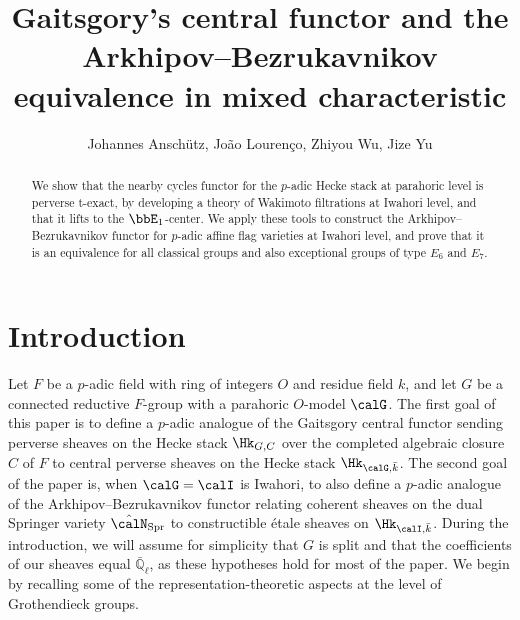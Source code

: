 \documentclass[10pt, reqno]{amsart}
\theoremstyle{plain}
\theoremstyle{definition}
\numberwithin{equation}{section}
\begin{document}
	
	\title[Gaitsgory and Arkhipov--Bezrukavnikov in mixed characteristic]{Gaitsgory's central functor and the Arkhipov--Bezrukavnikov equivalence in mixed characteristic}
	
	\author[J. Ansch\"utz, J. Louren\c{c}o, Z. Wu, J. Yu]{Johannes Ansch\"utz, Jo\~ao Louren\c{c}o, Zhiyou Wu, Jize Yu}
	
	
	\address{Département de Mathématiques, Université Paris-Saclay, Bâtiment 307, 91405 Orsay Cedex, France}
	
	
	
	\address{Mathematisches Institut, Universität Münster, Einsteinstrasse 62, Münster, Germany}
	
	\address{Morningside Center of Mathematics, Chinese Academy of Sciences, No. 55, Zhongguancun East Road, Haidian District, Beijing, China}
	
	\address{Department of Mathematics, Rice University, Houston, TX 77005, U.S.A.}
	
	\begin{abstract}
		We show that the nearby cycles functor for the $p$-adic Hecke stack at parahoric level is perverse t-exact, by developing a theory of Wakimoto filtrations at Iwahori level, and that it lifts to the $\bbE_1$-center. We apply these tools to construct the Arkhipov--Bezrukavnikov functor for $p$-adic affine flag varieties at Iwahori level, and prove that it is an equivalence for all classical groups and also exceptional groups of type $E_6$ and $E_7$. 
	\end{abstract}
	
	\maketitle
	\tableofcontents
	
	
	\section{Introduction} 
	\label{sec:introduction}
	
	Let $F$ be a $p$-adic field with ring of integers $O$ and residue field $k$, and let $G$ be a connected reductive $F$-group with a parahoric $O$-model $\calG$. The first goal of this paper is to define a $p$-adic analogue of the Gaitsgory central functor \cite{Gai01} sending perverse sheaves on the Hecke stack $\Hk_{G,C}$ over the completed algebraic closure $C$ of $F$ to central perverse sheaves on the Hecke stack $\Hk_{\calG,\bar k}$. The second goal of the paper is, when $\calG=\calI$ is Iwahori, to also define a $p$-adic analogue of the Arkhipov--Bezrukavnikov functor \cite{AB09} relating coherent sheaves on the dual Springer variety $\hat{\calN}_{\mathrm{Spr}}$ to constructible étale sheaves on $\Hk_{\calI,\bar k}$. During the introduction, we will assume for simplicity that $G$ is split and that the coefficients of our sheaves equal $\bar{\mathbb{Q}}_\ell$, as these hypotheses hold for most of the paper. We begin by recalling some of the representation-theoretic aspects at the level of Grothendieck groups.
	
\end{document}
